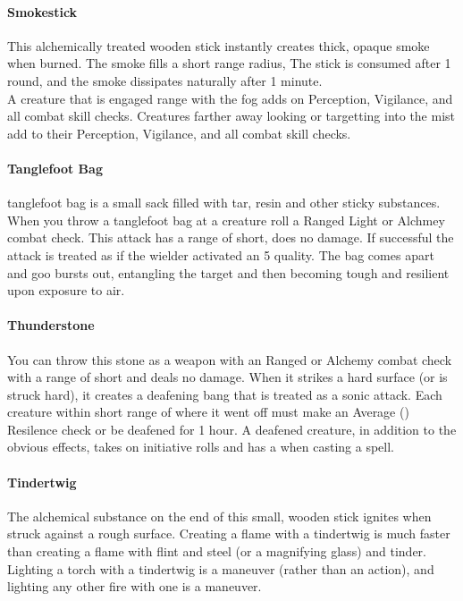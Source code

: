 \begin{multicols}{2}
\paragraph{Smokestick} \label{alcitm:smokestick}
This alchemically treated wooden stick instantly creates
thick, opaque smoke when burned. The smoke fills a
short range radius, The stick is consumed after 1 round,
and the smoke dissipates naturally after 1 minute.\\
A creature that is engaged range with the fog adds
\setback on Perception, Vigilance, and all combat skill
checks. Creatures farther away looking or targetting into
the mist add \setback\setback to their Perception, Vigilance,
and all combat skill checks.

\paragraph{Tanglefoot Bag} \label{alcitm:tanglefootbag}
tanglefoot bag is a small sack filled with tar, resin
and other sticky substances. When you throw a
tanglefoot bag at a creature roll a Ranged Light or
Alchmey combat check. This attack has a range of
short, does no damage. If successful the attack is treated
as if the wielder activated an  5 quality. The
bag comes apart and goo bursts out, entangling the
target and then becoming tough and resilient upon
exposure to air.

\paragraph{Thunderstone} \label{alcitm:thunderstone}
You can throw this stone as a weapon with an Ranged or
Alchemy combat check with a range of short and deals no damage.
When it strikes a hard surface (or is struck hard), it creates
a deafening bang that is treated as a sonic attack. Each creature
within short range of where it went off must make an Average
(\difficulty\difficulty) Resilence check or be deafened for 1
hour. A deafened creature, in addition to the obvious effects,
takes \setback\setback on initiative rolls and has a \setback
when casting a spell.

\paragraph{Tindertwig} \label{alcitm:tindertwig}
The alchemical substance on the end of this small,
wooden stick ignites when struck against a rough
surface. Creating a flame with a tindertwig is much
faster than creating a flame with flint and steel (or a
magnifying glass) and tinder. Lighting a torch with a
tindertwig is a maneuver (rather than an action), and
lighting any other fire with one is a maneuver.

\end{multicols}
\hrulefill

